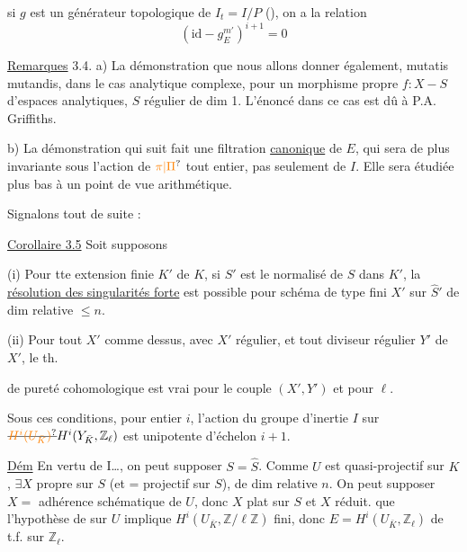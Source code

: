 si $g$ est un générateur topologique de $I_t=I/P$ (),  on a la relation
\[
(\mathrm{id}-g_E^{m'})^{i+1}=0
\tag*{(3.3)}
\]

\uline{Remarques} 3.4. a) La démonstration que nous allons donner   également, mutatis mutandis, dans le cas analytique complexe, pour un morphisme propre $f:X\mathbin{-}S$ d'espaces analytiques, $S$ régulier de dim 1.  L'énoncé dans ce cas est dû à P.A. Griffiths.

b) La démonstration qui suit   fait une filtration \uline{canonique} de $E$, qui sera de plus invariante sous l'action de $\unsure{\pi|\Pi}$ tout entier, pas seulement de $I$. Elle sera étudiée plus bas à un point de vue arithmétique.

Signalons tout de suite :

\uline{Corollaire 3.5}  Soit    supposons 

(i) Pour tte extension finie $K'$ de $K$, si $S'$ est le normalisé de $S$ dans $K'$, la \uline{résolution des singularités forte} est possible pour  schéma de type fini $X'$ sur $\hat S'$ de dim relative $\leq n$.

(ii) Pour tout  $X'$ comme dessus, avec $X'$ régulier, et tout diviseur régulier $Y'$ de $X'$, le th.

de pureté cohomologique est vrai pour le couple $(X',Y')$ et pour $\ell$.

Sous ces conditions,  pour  entier $i$, l'action du groupe d'inertie $I$ sur $\deleted{\unsure{H^i(U_{\bar K})}}H^i(Y_{\bar K},\mathbb Z_\ell)$ est  unipotente d'échelon $i+1$.

\uline{Dém} En vertu de I\ldots, on peut supposer $S=\hat S$.  Comme $U$ est quasi-projectif sur $K$,   $\exists X$  propre sur $S$ (et = projectif sur $S$),  de dim relative $n$. On peut supposer $X=$ adhérence schématique de $U$, donc $X$ plat sur $S$ et $X$ réduit.   que l'hypothèse de   sur $U$ implique $H^i(U_{\bar K},\mathbb Z/\ell\mathbb Z)$ fini, donc $E=H^i(U_{\bar K},\mathbb Z_\ell)$ de t.f. sur $\mathbb Z_\ell$.

